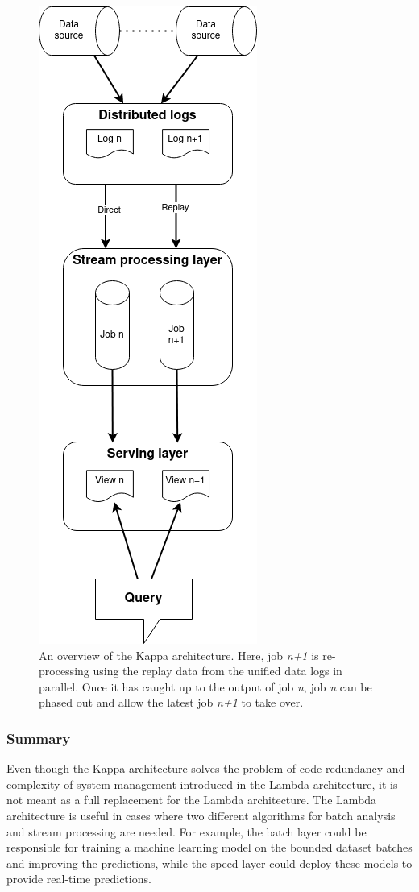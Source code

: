 \begin{figure}[!htbp]
    \centering
    \includegraphics[width=0.4\linewidth]{fig/kappa_arch.png}
    \caption[An overview of the Kappa architecture]
    {An overview of the Kappa architecture. Here, job \emph{n+1} is re-processing using the replay 
    data from the unified data logs in parallel. Once it has caught up to the output of job \emph{n}, 
    job \emph{n} can be phased out and allow the latest job \emph{n+1} to take over.}
    \label{fig:kappa_arch}
\end{figure}


\subsubsection{Summary}%
Even though the Kappa architecture solves the problem of code redundancy and complexity of 
system management introduced in the 
Lambda architecture, it is not meant as a full replacement for the Lambda architecture. 
The Lambda architecture is useful in cases where two different algorithms for 
batch analysis and stream processing are needed. For example, the batch layer could be responsible for training 
a machine learning model on the bounded dataset batches and improving the 
predictions, while the speed layer could deploy these models to provide real-time predictions. 


